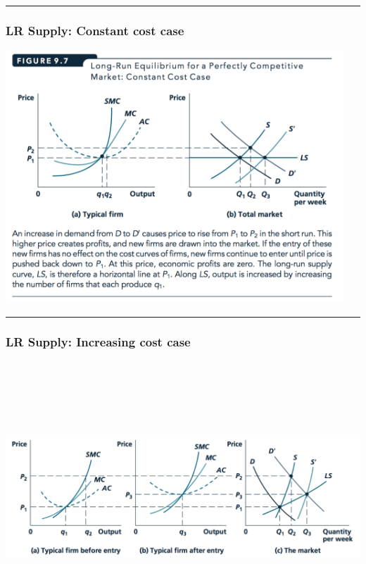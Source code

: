 \documentclass[]{article}
\begin{document}
\begin{center}\rule{0.5\linewidth}{\linethickness}\end{center}

\hypertarget{lr-supply-constant-cost-case}{%
\subsubsection{LR Supply: Constant cost
case}\label{lr-supply-constant-cost-case}}

\includegraphics[width=5in]{picsfigs/LR_constantcost.png}

\begin{center}\rule{0.5\linewidth}{\linethickness}\end{center}

\hypertarget{lr-supply-increasing-cost-case}{%
\subsubsection{LR Supply: Increasing cost
case}\label{lr-supply-increasing-cost-case}}

\includegraphics[height=4in]{picsfigs/incrcosts_lrsupply.png}
\end{document}
